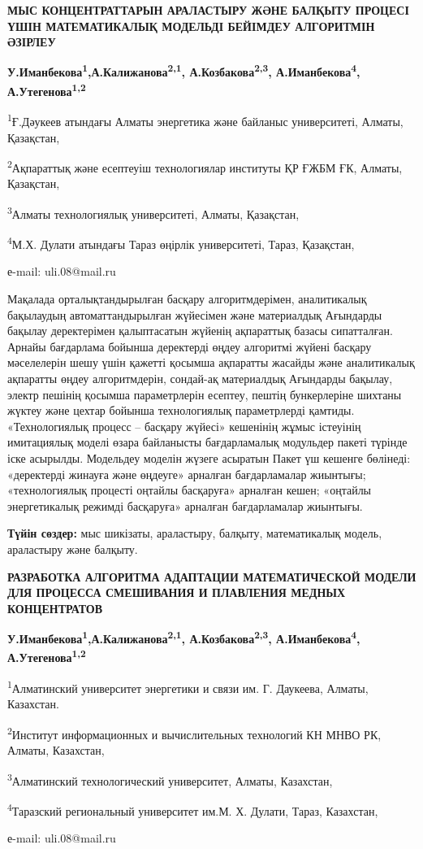 \begin{center}
{\large\bfseries МЫС КОНЦЕНТРАТТАРЫН АРАЛАСТЫРУ ЖӘНЕ БАЛҚЫТУ ПРОЦЕСІ ҮШІН
МАТЕМАТИКАЛЫҚ МОДЕЛЬДІ БЕЙІМДЕУ АЛГОРИТМІН ӘЗІРЛЕУ}

{\bfseries У.Иманбекова\textsuperscript{1}\envelope,А.Калижанова\textsuperscript{2,1},
А.Козбакова\textsuperscript{2,3}, А.Иманбекова\textsuperscript{4},
А.Утегенова\textsuperscript{1,2}}

\textsuperscript{1}Ғ.Дәукеев атындағы Алматы энергетика және байланыс
университеті, Алматы, Қазақстан,

\textsuperscript{2}Ақпараттық және есептеуіш технологиялар институты ҚР
ҒЖБМ ҒК, Алматы, Қазақстан,

\textsuperscript{3}Алматы технологиялық университеті, Алматы, Қазақстан,

\textsuperscript{4}М.Х. Дулати атындағы Тараз өңірлік университеті,
Тараз, Қазақстан,

е-mail: uli.08@mail.ru
\end{center}

Мақалада орталықтандырылған басқару алгоритмдерімен, аналитикалық
бақылаудың автоматтандырылған жүйесімен және материалдық Ағындарды
бақылау деректерімен қалыптасатын жүйенің ақпараттық базасы сипатталған.
Арнайы бағдарлама бойынша деректерді өңдеу алгоритмі жүйені басқару
мәселелерін шешу үшін қажетті қосымша ақпаратты жасайды және
аналитикалық ақпаратты өңдеу алгоритмдерін, сондай-ақ материалдық
Ағындарды бақылау, электр пешінің қосымша параметрлерін есептеу, пештің
бункерлеріне шихтаны жүктеу және цехтар бойынша технологиялық
параметрлерді қамтиды. «Технологиялық процесс -- басқару жүйесі»
кешенінің жұмыс істеуінің имитациялық моделі өзара байланысты
бағдарламалық модульдер пакеті түрінде іске асырылды. Модельдеу моделін
жүзеге асыратын Пакет үш кешенге бөлінеді: «деректерді жинауға және
өңдеуге» арналған бағдарламалар жиынтығы; «технологиялық процесті
оңтайлы басқаруға» арналған кешен; «оңтайлы энергетикалық режимді
басқаруға» арналған бағдарламалар жиынтығы.

{\bfseries Түйін сөздер:} мыс шикізаты, араластыру, балқыту, математикалық
модель, араластыру және балқыту.
\newpage
\begin{center}
{\large\bfseries РАЗРАБОТКА АЛГОРИТМА АДАПТАЦИИ МАТЕМАТИЧЕСКОЙ МОДЕЛИ ДЛЯ
ПРОЦЕССА СМЕШИВАНИЯ И ПЛАВЛЕНИЯ МЕДНЫХ КОНЦЕНТРАТОВ}

{\bfseries У.Иманбекова\textsuperscript{1}\envelope,А.Калижанова\textsuperscript{2,1},
А.Козбакова\textsuperscript{2,3}, А.Иманбекова\textsuperscript{4},
А.Утегенова\textsuperscript{1,2}}

\textsuperscript{1}Алматинский университет энергетики и связи им. Г.
Даукеева, Алматы, Казахстан.

\textsuperscript{2}Институт информационных и вычислительных технологий
КН МНВО РК, Алматы, Казахстан,

\textsuperscript{3}Алматинский технологический университет, Алматы,
Казахстан,

\textsuperscript{4}Таразский региональный университет им.М. Х. Дулати,
Тараз, Казахстан,

е-mail: uli.08@mail.ru
\end{center}

